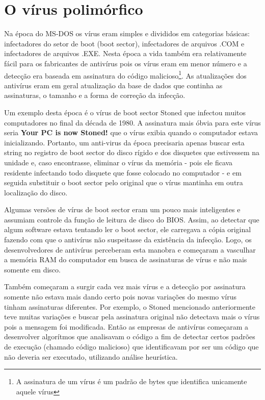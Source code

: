 \chapter{O vírus polimórfico}

Na época do MS-DOS os vírus eram simples e divididos em categorias básicas: infectadores do setor de boot (boot sector\cite{wiki:5}), infectadores de arquivos .COM e infectadores de arquivos .EXE. Nesta época a vida também era relativamente fácil para os fabricantes de antivírus pois os vírus eram em menor número e a detecção era baseada em assinatura do código malicioso\footnote{A assinatura de um vírus é um padrão de bytes que identifica unicamente aquele vírus}. As atualizações dos antivírus eram em geral atualização da base de dados que continha as assinaturas, o tamanho e a forma de correção da infecção.

Um exemplo desta época é o vírus de boot sector Stoned\cite{wiki:6} que infectou muitos computadores no final da década de 1980. A assinatura mais óbvia para este vírus seria \textbf{Your PC is now Stoned!} que o vírus exibia quando o computador estava inicializando. Portanto, um anti-virus da época precisaria apenas buscar esta string no registro de boot sector do disco rígido e dos disquetes que estivessem na unidade e, caso encontrasse, eliminar o vírus da memória - pois ele ficava residente infectando todo disquete que fosse colocado no computador - e em seguida substituir o boot sector pelo original que o vírus mantinha em outra localização do disco.

Algumas versões de vírus de boot sector eram um pouco mais inteligentes e assumiam controle da função de leitura de disco do BIOS. Assim, ao detectar que algum software estava tentando ler o boot sector, ele carregava a cópia original fazendo com que o antivírus não suspeitasse da existência da infecção. Logo, os desenvolvedores de antivírus perceberam esta manobra e começaram a vasculhar a memória RAM do computador em busca de assinaturas de vírus e não mais somente em disco.

Também começaram a surgir cada vez mais vírus e a detecção por assinatura somente não estava mais dando certo pois novas variações do mesmo vírus tinham assinaturas diferentes. Por exemplo, o Stoned mencionado anteriormente teve muitas variações e buscar pela assinatura original não detectava mais o vírus pois a mensagem foi modificada. Então as empresas de antivírus começaram a desenvolver algorítmos que analisavam o código a fim de detectar certos padrões de execução (chamado código malicioso) que identificavam por ser um código que não deveria ser executado, utilizando análise heurística\cite{wiki:7,avg:1}.

